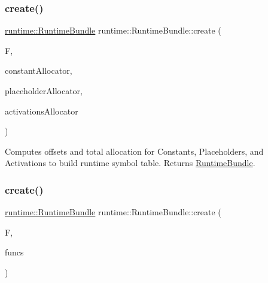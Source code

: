 \subsubsection{\texorpdfstring{create()}{create()}\hspace{0.1cm}{\footnotesize\ttfamily [1/4]}}
{\footnotesize\ttfamily \hyperlink{classglow_1_1runtime_1_1_runtime_bundle}{runtime\+::\+Runtime\+Bundle} runtime\+::\+Runtime\+Bundle\+::create (\begin{DoxyParamCaption}\item[{const \hyperlink{classglow_1_1_i_r_function}{I\+R\+Function} \&}]{F,  }\item[{\hyperlink{classglow_1_1_memory_allocator}{Memory\+Allocator} \&}]{constant\+Allocator,  }\item[{\hyperlink{classglow_1_1_memory_allocator}{Memory\+Allocator} \&}]{placeholder\+Allocator,  }\item[{\hyperlink{classglow_1_1_memory_allocator}{Memory\+Allocator} \&}]{activations\+Allocator }\end{DoxyParamCaption})\hspace{0.3cm}{\ttfamily [static]}}

Computes offsets and total allocation for Constants, Placeholders, and Activations to build runtime symbol table. Returns \hyperlink{classglow_1_1runtime_1_1_runtime_bundle}{Runtime\+Bundle}. \mbox{\label{classglow_1_1runtime_1_1_runtime_bundle_afd92718c1299dccfed7f2d667eb3eb69}} 
\subsubsection{\texorpdfstring{create()}{create()}\hspace{0.1cm}{\footnotesize\ttfamily [2/4]}}
{\footnotesize\ttfamily \hyperlink{classglow_1_1runtime_1_1_runtime_bundle}{runtime\+::\+Runtime\+Bundle} runtime\+::\+Runtime\+Bundle\+::create (\begin{DoxyParamCaption}\item[{const \hyperlink{classglow_1_1_function}{Function} \&}]{F,  }\item[{const std\+::vector$<$ const \hyperlink{classglow_1_1_i_r_function}{I\+R\+Function} $\ast$$>$ \&}]{funcs }\end{DoxyParamCaption})\hspace{0.3cm}{\ttfamily [static]}}

